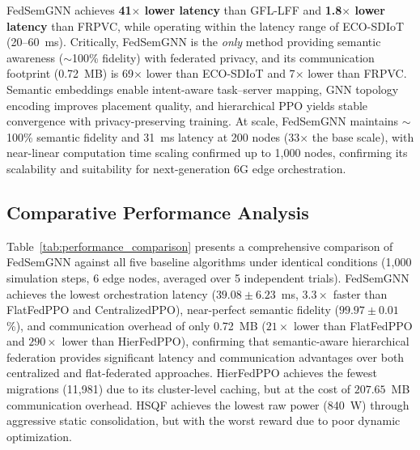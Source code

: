 \documentclass[conference]{IEEEtran}
\begin{document}
	\textcolor{revblue}{FedSemGNN achieves \textbf{41$\times$ lower latency} than GFL-LFF and \textbf{1.8$\times$ lower latency} than FRPVC, while operating within the latency range of ECO-SDIoT (20--60~ms).}
	\textcolor{revblue}{Critically, FedSemGNN is the \emph{only} method providing semantic awareness ($\sim$100\% fidelity) with federated privacy, and its communication footprint (0.72~MB) is 69$\times$ lower than ECO-SDIoT and 7$\times$ lower than FRPVC.}
	Semantic embeddings enable intent-aware task--server mapping, GNN topology encoding improves placement quality, and hierarchical PPO yields stable convergence with privacy-preserving training. 
	\textcolor{revblue}{At scale, FedSemGNN maintains $\sim$100\% semantic fidelity and 31~ms latency at 200 nodes (33$\times$ the base scale), with near-linear computation time scaling confirmed up to 1{,}000 nodes, confirming its scalability and suitability for next-generation 6G edge orchestration.}
	
	
	\subsection{Comparative Performance Analysis}
	\textcolor{revblue}{Table~\ref{tab:performance_comparison} presents a comprehensive comparison of FedSemGNN against all five baseline algorithms under identical conditions (1{,}000 simulation steps, 6 edge nodes, averaged over 5 independent trials). FedSemGNN achieves the lowest orchestration latency ($39.08\pm6.23$~ms, $3.3\times$ faster than FlatFedPPO and CentralizedPPO), near-perfect semantic fidelity ($99.97\pm0.01$\%), and communication overhead of only 0.72~MB ($21\times$ lower than FlatFedPPO and $290\times$ lower than HierFedPPO), confirming that semantic-aware hierarchical federation provides significant latency and communication advantages over both centralized and flat-federated approaches. HierFedPPO achieves the fewest migrations (11{,}981) due to its cluster-level caching, but at the cost of $207.65$~MB communication overhead. HSQF achieves the lowest raw power (840~W) through aggressive static consolidation, but with the worst reward due to poor dynamic optimization.}
\end{document}
